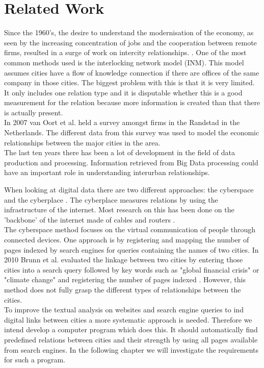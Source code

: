 \section{Related Work}
Since the 1960's, the desire to understand the modernisation of the economy, as seen by the increasing concentration of jobs and the cooperation between remote firms, resulted in a surge of work on intercity relationships. \cite{tornqvist1968flows}.
One of the most common methods used is the interlocking network model (INM)\cite{taylor2012interlocking}. This model assumes cities have a flow of knowledge connection if there are offices of the same company in those cities. The biggest problem with this is that it is very limited. It only includes one relation type and it is disputable whether this is a good measurement for the relation because more information is created than that there is actually present. \\
In 2007 van Oort et al. \cite{van2010economic} held a survey amongst firms in the Randstad in the Netherlands. The different data from this survey was used to model the economic relationships between the major cities in the area. \\

The last ten years there has been a lot of development in the field of data production and processing. Information retrieved from Big Data processing could have an important role in understanding interurban relationships.

When looking at digital data there are two different approaches: the cyberspace and the cyberplace \cite{devriendt2008cyberplace}. The cyberplace measures relations by using the infrastructure of the internet. Most research on this has been done on the 'backbone' of the internet made of cables and routers \cite{choi2006comparing, gorman2000networks}. \\

The cyberspace method focuses on the virtual communication of people through connected devices. One approach is by registering and mapping the number of pages indexed by search engines for queries containing the names of two cities\cite{devriendt2008cyberplace, janc2015visibility, janc2015geography}. In 2010 Brunn et al. evaluated the linkage between two cities by entering those cities into a search query followed by key words such as "global financial crisis" or "climate change" and registering the number of pages indexed \cite{brunn2010networks}. However, this method does not fully grasp the different types of relationships between the cities. \\

To improve the textual analysis on websites and search engine queries to ind digital links between cities a more systematic approach is needed.  Therefore we intend develop a computer program which does this. It should automatically find predefined relations between cities and their strength by using all pages available from search engines. In the following chapter we will investigate the requirements for such a program.
